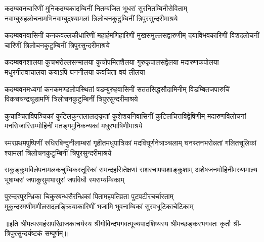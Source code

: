 
\fourlineindentedshloka
{कदम्बवनचारिणीं मुनिकदम्बकादम्बिनीं}
{नितम्बजित भूधरां सुरनितम्बिनीसेविताम्}
{नवाम्बुरुहलोचनामभिनवाम्बुदश्यामलां}
{त्रिलोचनकुटुम्बिनीं त्रिपुरसुन्दरीमाश्रये} %

\fourlineindentedshloka
{कदम्बवनवासिनीं कनकवल्लकीधारिणीं}
{महार्हमणिहारिणीं मुखसमुल्लसद्वारुणीम्}
{दयाविभवकारिणीं विशदलोचनीं चारिणीं}
{त्रिलोचनकुटुम्बिनीं त्रिपुरसुन्दरीमाश्रये} %

\fourlineindentedshloka
{कदम्बवनशालया कुचभरोल्लसन्मालया}
{कुचोपमितशैलया गुरुकृपालसद्वेलया}
{मदारुणकपोलया मधुरगीतवाचालया}
{कयाऽपि घननीलया कवचिता वयं लीलया} %

\fourlineindentedshloka
{कदम्बवनमध्यगां कनकमण्डलोपस्थितां}
{षडम्बुरुहवासिनीं सततसिद्धसौदामिनीम्}
{विडम्बितजपारुचिं विकचचन्द्रचूडामणिं}
{त्रिलोचनकुटुम्बिनीं त्रिपुरसुन्दरीमाश्रये} %

\fourlineindentedshloka
{कुचाञ्चितविपञ्चिकां कुटिलकुन्तलालङ्कृतां}
{कुशेशयनिवासिनीं कुटिलचित्तविद्वेषिणीम्}
{मदारुणविलोचनां मनसिजारिसम्मोहिनीं}
{मतङ्गमुनिकन्यकां मधुरभाषिणीमाश्रये} %

\fourlineindentedshloka
{स्मरप्रथमपुष्पिणीं रुधिरबिन्दुनीलाम्बरां}
{गृहीतमधुपात्रिकां मदविघूर्णनेत्राञ्चलाम्}
{घनस्तनभरोन्नतां गलितचूलिकां श्यामलां}
{त्रिलोचनकुटुम्बिनीं त्रिपुरसुन्दरीमाश्रये} %

\fourlineindentedshloka
{सकुङ्कुमविलेपनामलकचुम्बिकस्तूरिकां}
{समन्दहसितेक्षणां सशरचापपाशाङ्कुशाम्}
{अशेषजनमोहिनीमरुणमाल्य भूषाम्बरां}
{जपाकुसुमभासुरां जपविधौ स्मराम्यम्बिकाम्} %

\fourlineindentedshloka
{पुरन्दरपुरन्ध्रिका चिकुरबन्धसैरन्ध्रिकां}
{पितामहपतिव्रता पुटपटीरचर्चारताम्}
{मुकुन्दरमणीमणीलसदलङ्क्रियाकारिणीं}
{भजामि भुवनाम्बिकां सुरवधूटिकाचेटिकाम्} %

॥इति श्रीमत्परमहंसपरिव्राजकाचर्यस्य श्रीगोविन्दभगवत्पूज्यपादशिष्यस्य श्रीमच्छङ्करभगवतः कृतौ श्री-त्रिपुरसुन्दर्यष्टकं सम्पूर्णम्॥